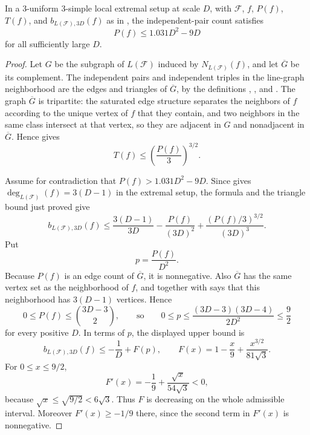 \begin{lemma}
In a $3$-uniform $3$-simple local extremal setup at scale $D$, with
$\mathcal F$, $f$, $P(f)$, $T(f)$, and
$b_{L(\mathcal F),3D}(f)$ as in
, the independent-pair count
satisfies
\[
P(f)\le 1.031D^2-9D
\]
for all sufficiently large $D$.
\end{lemma}
\begin{proof}
Let $G$ be the subgraph of $L(\mathcal F)$ induced by
$N_{L(\mathcal F)}(f)$, and let $\overline G$ be its complement.  The
independent pairs and independent triples in the line-graph neighborhood are
the edges and triangles of $\overline G$, by the definitions
, , and
.  The graph $\overline G$ is tripartite:
the saturated edge structure separates the neighbors of $f$ according to the
unique vertex of $f$ that they contain, and two neighbors in the same class
intersect at that vertex, so they are adjacent in $G$ and nonadjacent in
$\overline G$.  Hence  gives
\[
T(f)\le \left(\frac{P(f)}3\right)^{3/2}.
\]

Assume for contradiction that
$P(f)>1.031D^2-9D$.  Since
 gives
$\deg_{L(\mathcal F)}(f)=3(D-1)$ in the extremal setup, the formula
 and the triangle bound just proved give
\[
b_{L(\mathcal F),3D}(f)
\le
\frac{3(D-1)}{3D}
-\frac{P(f)}{(3D)^2}
+\frac{(P(f)/3)^{3/2}}{(3D)^3}.
\]
Put
\[
p=\frac{P(f)}{D^2}.
\]
Because $P(f)$ is an edge count of $\overline G$, it is nonnegative.  Also
$\overline G$ has the same vertex set as the neighborhood of $f$, and
 together with
 says that this neighborhood
has $3(D-1)$ vertices.  Hence
\[
0\le P(f)\le \binom{3D-3}{2},
\qquad\text{so}\qquad
0\le p\le \frac{(3D-3)(3D-4)}{2D^2}\le \frac92
\]
for every positive $D$.  In terms of $p$, the displayed upper bound is
\[
b_{L(\mathcal F),3D}(f)
\le
-\frac1D+F(p),
\qquad
F(x)=1-\frac{x}{9}+\frac{x^{3/2}}{81\sqrt3}.
\]
For $0\le x\le 9/2$,
\[
F'(x)=-\frac19+\frac{\sqrt{x}}{54\sqrt3}<0,
\]
because $\sqrt{x}\le\sqrt{9/2}<6\sqrt3$.  Thus $F$ is decreasing on the
whole admissible interval.  Moreover $F'(x)\ge -1/9$ there, since the second
term in $F'(x)$ is nonnegative.


\end{proof}
